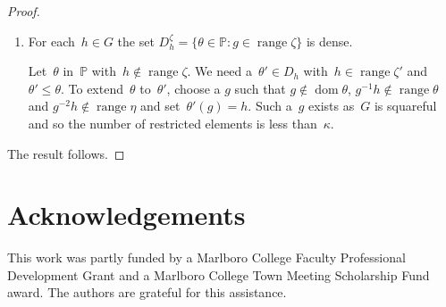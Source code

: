 \documentclass[12pt,a4paper]{article}
\DeclareMathOperator{\dom}{dom}
\DeclareMathOperator{\ran}{range}
\renewcommand{\P}{\mathbb{P}}
\begin{document}
\begin{proof}
\begin{enumerate}
\item For each~$h \in G$ the set  $D_h^{\zeta} = \{ \theta \in \P : g \in \ran \zeta \}$ is dense.

Let~$\theta$ in~$\P$ with~$h \not\in \ran \zeta$.  We need a~$\theta' \in D_h$ with~$h \in \ran \zeta'$ and $\theta' \leq \theta$.
To extend~$\theta$ to~$\theta'$,  choose a $g$ such that $g \not\in \dom \theta$, $g^{-1}h \not\in \ran \theta$ and $g^{-2}h \not\in \ran \eta$ and set~$\theta'(g) = h$.  Such a~$g$ exists as~$G$ is squareful and so the number of restricted elements is less than~$\kappa$.
\end{enumerate}

The result follows.
\end{proof}




\section*{Acknowledgements}

This work was partly funded by a Marlboro College Faculty Professional Development Grant and a Marlboro College Town Meeting Scholarship Fund award.  The authors are grateful for this assistance.
\end{document}
